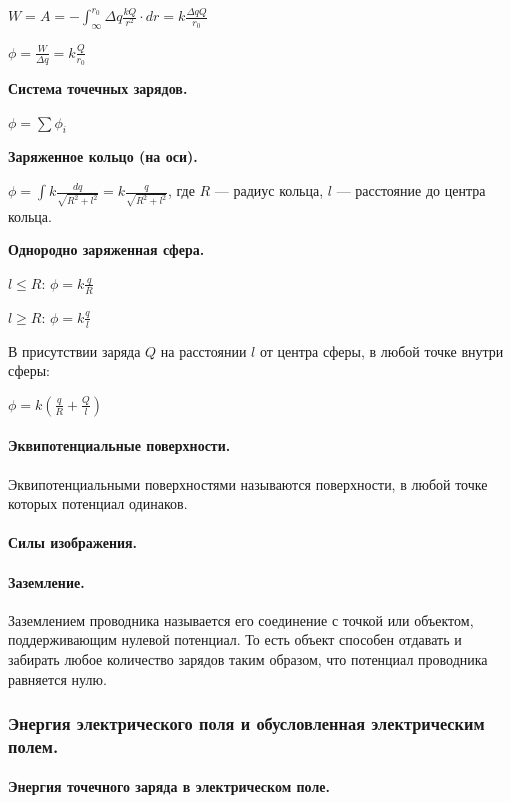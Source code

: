 \documentclass{article}
\begin{document}
                \(W = A = -\int_\infty^{r_0} \Delta q\frac{kQ}{r^2} \cdot dr = k\frac{\Delta q Q}{r_0}\)

                \(\phi = \frac{W}{\Delta q} = k\frac{Q}{r_0}\)

                \textbf{Система точечных зарядов.}
                
                \(\phi = \sum{\phi_i}\)

                \textbf{Заряженное кольцо (на оси).}

                \(\phi = \int k\frac{dq}{\sqrt{R^2 + l^2}} = k\frac{q}{\sqrt{R^2 + l^2}}\), где \(R\) --- радиус кольца, \(l\) --- расстояние до центра кольца.

                \textbf{Однородно заряженная сфера.}
                
                \(l \leq R\): \(\phi = k\frac{q}{R}\)

                \(l \geq R\): \(\phi = k\frac{q}{l}\)

                В присутствии заряда \(Q\) на расстоянии \(l\) от центра сферы, в любой точке внутри сферы:

                \(\phi = k(\frac{q}{R} + \frac{Q}{l})\)
            \paragraph{Эквипотенциальные поверхности.}
                Эквипотенциальными поверхностями называются поверхности, в любой точке которых потенциал одинаков.
            \paragraph{Силы изображения.}
            \paragraph{Заземление.}
                Заземлением проводника называется его соединение с точкой или объектом, поддерживающим нулевой потенциал. То есть объект способен отдавать и забирать любое количество зарядов таким образом, что потенциал проводника равняется нулю.
        \subsubsection{Энергия электрического поля и обусловленная электрическим полем.}
            \paragraph{Энергия точечного заряда в электрическом поле.}
\end{document}

